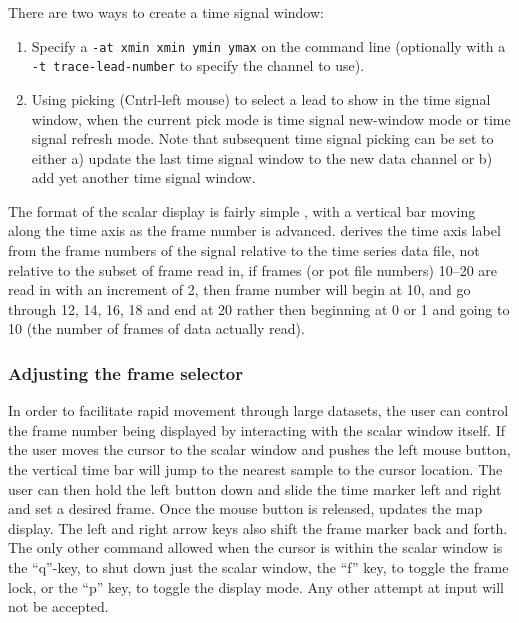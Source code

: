 There are two ways to create a time signal window:
%
\begin{enumerate}
  \item Specify a \texttt{-at xmin xmin ymin ymax} on the command line
        (optionally with a \texttt{-t trace-lead-number} to specify the
        channel to use).
      \item Using picking (Cntrl-left mouse) to select a lead to show in
        the time signal window, when the current pick mode is time signal
        new-window mode or time signal refresh mode.  Note that subsequent
        time signal picking can be set to either a) update the last time
        signal window to the new data channel or b) add yet another time
        signal window.
\end{enumerate}
%

The format of the scalar display is fairly simple 
, with a vertical bar moving along the time axis as the frame number is
advanced.  \map{} derives the time axis label from the frame numbers of the
signal relative to the time series data file, not relative to the subset of
frame read in, \ie{} if frames (or pot file numbers) 10--20 are read in
with an increment of 2, then frame number will begin at 10, and go through
12, 14, 16, 18 and end at 20 rather then beginning at 0 or 1 and going to 10
(the number of frames of data actually read).


\subsubsection{Adjusting the frame selector}
\label{sec:control-frames} 

In order to facilitate rapid movement through large datasets, the user can
control the frame number being displayed by interacting with the scalar
window itself.  If the user moves the cursor to the scalar window and
pushes the left mouse button, the vertical time bar will jump to the
nearest sample to the cursor location.  The user can then hold the left
button down and slide the time marker left and right and set a desired
frame.  Once the mouse button is released,\map{} updates the map display.
The left and right arrow keys also shift the frame marker back and forth.
The only other command allowed when the cursor is within the scalar window
is the ``q''-key, to shut down just the scalar window, the ``f'' key,
to toggle the frame lock, or the ``p'' key, to toggle the display mode.
Any other attempt at input will not be accepted.


